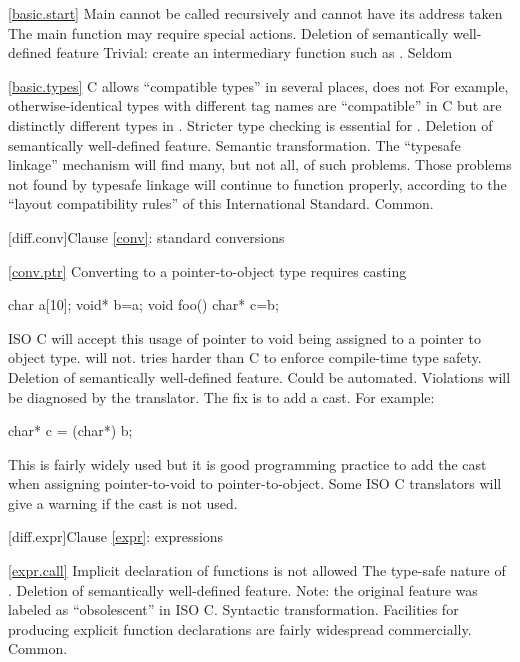\ref{basic.start}
\change Main cannot be called recursively and cannot have its address taken
\rationale
The  main  function may require special actions.
\effect
Deletion of semantically well-defined feature
\difficulty
Trivial: create an intermediary function such as
.
\howwide
Seldom

\ref{basic.types}
\change C allows ``compatible types'' in several places, \Cpp does not
For example,
otherwise-identical  types with different tag names
are ``compatible'' in C but are distinctly different types
in \Cpp.
\rationale
Stricter type checking is essential for \Cpp.
\effect
Deletion of semantically well-defined feature.
\difficulty
Semantic transformation.
The ``typesafe linkage'' mechanism will find many, but not all,
of such problems.
Those problems not found by typesafe linkage will continue to
function properly,
according to the ``layout compatibility rules'' of this
International Standard.
\howwide
Common.

[diff.conv]{Clause \ref{conv}: standard conversions}

\ref{conv.ptr}
\change Converting  to a pointer-to-object type requires casting

\begin{codeblock}
char a[10];
void* b=a;
void foo() {
  char* c=b;
}
\end{codeblock}

ISO C will accept this usage of pointer to void being assigned
to a pointer to object type.
\Cpp will not.
\rationale
\Cpp tries harder than C to enforce compile-time type safety.
\effect
Deletion of semantically well-defined feature.
\difficulty
Could be automated.
Violations will be diagnosed by the \Cpp translator.
The
fix is to add a  cast.
For example:

\begin{codeblock}
char* c = (char*) b;
\end{codeblock}

\howwide
This is fairly widely used but it is good
programming practice to add the cast when assigning pointer-to-void to pointer-to-object.
Some ISO C translators will give a warning
if the cast is not used.

[diff.expr]{Clause \ref{expr}: expressions}

\ref{expr.call}
\change Implicit declaration of functions is not allowed
\rationale
The type-safe nature of \Cpp.
\effect
Deletion of semantically well-defined feature.
Note: the original feature was labeled as ``obsolescent'' in ISO C.
\difficulty
Syntactic transformation.
Facilities for producing explicit function declarations are fairly
widespread commercially.
\howwide
Common.

